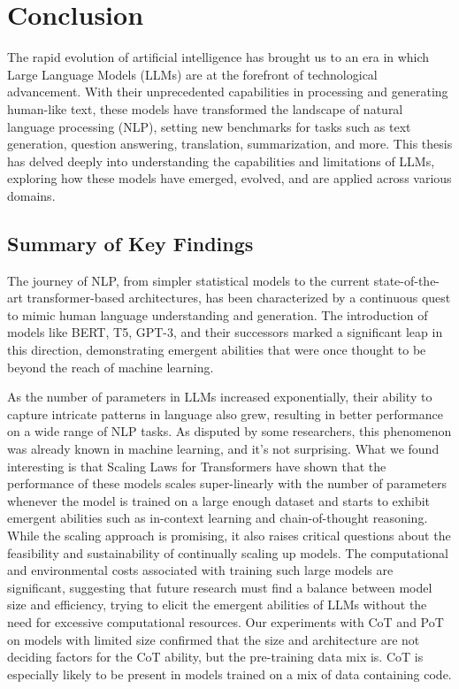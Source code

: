 
\chapter*{Conclusion}
The rapid evolution of artificial intelligence has brought us to an era in which Large Language Models (LLMs) are at the forefront of technological advancement.
With their unprecedented capabilities in processing and generating human-like text, these models have transformed the landscape of natural language processing (NLP), setting new benchmarks for tasks such as text generation, question answering, translation, summarization, and more.
This thesis has delved deeply into understanding the capabilities and limitations of LLMs, exploring how these models have emerged, evolved, and are applied across various domains.

\section*{Summary of Key Findings}
The journey of NLP, from simpler statistical models to the current state-of-the-art transformer-based architectures, has been characterized by a continuous quest to mimic human language understanding and generation.
The introduction of models like BERT, T5, GPT-3, and their successors marked a significant leap in this direction, demonstrating emergent abilities that were once thought to be beyond the reach of machine learning.

As the number of parameters in LLMs increased exponentially, their ability to capture intricate patterns in language also grew, resulting in better performance on a wide range of NLP tasks.
As disputed by some researchers, this phenomenon was already known in machine learning, and it's not surprising.
What we found interesting is that Scaling Laws for Transformers have shown that the performance of these models scales super-linearly with the number of parameters whenever the model is trained on a large enough dataset and starts to exhibit emergent abilities such as in-context learning and chain-of-thought reasoning.
While the scaling approach is promising, it also raises critical questions about the feasibility and sustainability of continually scaling up models.
The computational and environmental costs associated with training such large models are significant, suggesting that future research must find a balance between model size and efficiency, trying to elicit the emergent abilities of LLMs without the need for excessive computational resources.
Our experiments with CoT and PoT on models with limited size confirmed that the size and architecture are not deciding factors for the CoT ability, but the pre-training data mix is.
CoT is especially likely to be present in models trained on a mix of data containing code.

